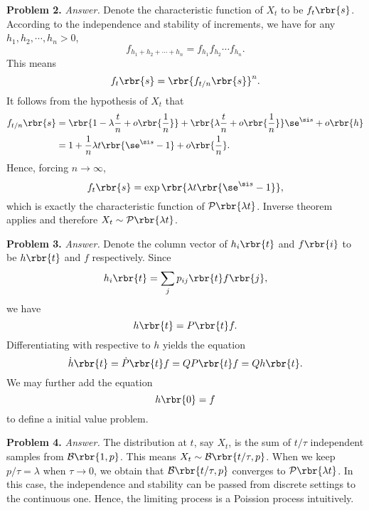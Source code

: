 \documentclass[english, nochinese]{pnote}
\begin{document}
\textbf{Problem 2.} \textit{Answer.} Denote the characteristic function of $X_t$ to be $ f_t \rbr{s} $. According to the independence and stability of increments, we have for any $ h_1, h_2, \cdots, h_n > 0 $,
\begin{equation}
f_{ h_1 + h_2 + \cdots + h_n } = f_{h_1} f_{h_2} \cdots f_{h_n}.
\end{equation}
This means
\begin{equation}
f_t \rbr{s} = \rbr{ f_{ t / n } \rbr{s} }^n.
\end{equation}
It follows from the hypothesis of $X_t$ that
\begin{equation}
\begin{split}
f_{ t / n } \rbr{s} &= \rbr{ 1 - \lambda \frac{t}{n} + o \rbr{\frac{1}{n}} } + \rbr{ \lambda \frac{t}{n} + o \rbr{\frac{1}{n}} } \se^{ \si s } + o \rbr{h} \\
&= 1 + \frac{1}{n} \lambda t \rbr{ \se^{ \si s } - 1 } + o \rbr{\frac{1}{n}}.
\end{split}
\end{equation}
Hence, forcing $ n \rightarrow \infty $,
\begin{equation}
f_t \rbr{s} = \exp \rbr{ \lambda t \rbr{ \se^{ \si s } - 1 } },
\end{equation}
which is exactly the characteristic function of $ \mathcal{P} \rbr{ \lambda t } $. Inverse theorem applies and therefore $ X_t \sim \mathcal{P} \rbr{ \lambda t } $.

\textbf{Problem 3.} \textit{Answer.} Denote the column vector of $ h_i \rbr{t} $ and $ f \rbr{i} $ to be $ h \rbr{t} $ and $f$ respectively. Since
\begin{equation}
h_i \rbr{t} = \sum_j p_{ i j } \rbr{t} f \rbr{j},
\end{equation}
we have
\begin{equation}
h \rbr{t} = P \rbr{t} f.
\end{equation}
Differentiating with respective to $h$ yields the equation
\begin{equation}
\dot{h} \rbr{t} = \dot{P} \rbr{t} f = Q P \rbr{t} f = Q h \rbr{t}.
\end{equation}
We may further add the equation
\begin{equation}
h \rbr{0} = f
\end{equation}
to define a initial value problem.

\textbf{Problem 4.} \textit{Answer.} The distribution at $t$, say $X_t$, is the sum of $ t / \tau $ independent samples from $ \mathcal{B} \rbr{ 1, p } $. This means $ X_t \sim \mathcal{B} \rbr{ t / \tau, p } $. When we keep $ p / \tau = \lambda $ when $ \tau \rightarrow 0 $, we obtain that $ \mathcal{B} \rbr{ t / \tau, p } $ converges to $ \mathcal{P} \rbr{ \lambda t } $. In this case, the independence and stability can be passed from discrete settings to the continuous one. Hence, the limiting process is a Poission process intuitively.
\end{document}
